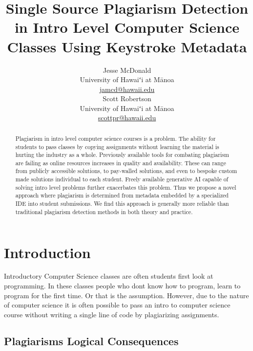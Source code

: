 \documentclass[10pt]{article}
\author{Jesse McDonald \\
  University of Hawaiʻi at M\=anoa \\
  {\underline{ jamcd@hawaii.edu}} \\ \And
  Scott Robertson \\
  University of Hawaiʻi at M\=anoa \\
  {\underline{ scottpr@hawaii.edu} } \\ 
}
\date{}
\begin{document}
\title{Single Source Plagiarism Detection in Intro Level Computer Science Classes Using Keystroke Metadata}


 



\maketitle

\begin{abstract}
Plagiarism in intro level computer science courses is a problem.  The ability for students to pass classes by copying assignments without learning the material is hurting the industry as a whole.  Previously available tools for combating plagiarism are failing as online resources increases in quality and availability.  These can range from publicly accessible solutions, to pay-walled solutions, and even to bespoke custom made solutions individual to each student.  Freely available generative AI capable of solving intro level problems further exacerbates this problem.  Thus we propose a novel approach where plagiarism is determined from metadata embedded by a specialized IDE into student submissions.  We find this approach is generally more reliable than traditional plagiarism detection methods in both theory and practice. 
\end{abstract}
\section{Introduction}

Introductory Computer Science classes are often students first look at programming.  In these classes people who dont know how to program, learn to program for the first time.  Or that is the assumption.  However, due to the nature of computer science it is often possible to pass an intro to computer science course without writing a single line of code by plagiarizing assignments.
	\subsection{Plagiarisms Logical Consequences}
	
\end{document}
